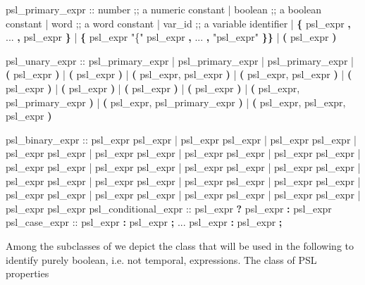 \begin{Grammar}
psl_primary_expr ::
   number                              ;; a numeric constant
 | boolean                             ;; a boolean constant
 | word                                ;; a word constant
 | var_id                              ;; a variable identifier
 | \textbf{\{} psl_expr \textbf{,} ... \textbf{,} psl_expr \textbf{\}}
 | \textbf{\{} psl_expr "\{" psl_expr \textbf{,} ... \textbf{,} "psl_expr" \textbf{\}}\textbf{\}}
 | \textbf{(} psl_expr \textbf{)}

psl_unary_expr ::
   \operator{+} psl_primary_expr     
 | \operator{-} psl_primary_expr  
 | \operator{!} psl_primary_expr  
 |  \textbf{(} psl_expr \textbf{)}
 |  \textbf{(} psl_expr \textbf{)}
 |  \textbf{(} psl_expr, psl_expr \textbf{)}
 |  \textbf{(} psl_expr, psl_expr \textbf{)}
 |  \textbf{(} psl_expr \textbf{)}
 |  \textbf{(} psl_expr \textbf{)}
 |  \textbf{(} psl_expr \textbf{)}
 |  \textbf{(} psl_expr \textbf{)}
 |  \textbf{(} psl_expr, psl_primary_expr \textbf{)}
 |  \textbf{(} psl_expr, psl_primary_expr \textbf{)}
 |  \textbf{(} psl_expr, psl_expr, psl_expr \textbf{)}

psl_binary_expr ::
   psl_expr \operator{+} psl_expr    
 | psl_expr  psl_expr 
 | psl_expr  psl_expr 
 | psl_expr \operator{-} psl_expr   
 | psl_expr \operator{*}psl_expr   
 | psl_expr \operator{/} psl_expr   
 | psl_expr \operator{\%} psl_expr 
 | psl_expr \operator{==} psl_expr    
 | psl_expr \operator{!=} psl_expr  
 | psl_expr \operator{<} psl_expr       
 | psl_expr \operator{<=} psl_expr       
 | psl_expr \operator{>} psl_expr       
 | psl_expr \operator{>=} psl_expr       
 | psl_expr \operator{&} psl_expr 
 | psl_expr \operator{|} psl_expr 
 | psl_expr  psl_expr 
 | psl_expr  psl_expr 
 | psl_expr \operator{<<} psl_expr 
 | psl_expr \operator{>>} psl_expr 
 | psl_expr \operator{::} psl_expr 
psl_conditional_expr ::
 psl_expr \textbf{?} psl_expr \textbf{:} psl_expr 
psl_case_expr ::
     psl_expr \textbf{:} psl_expr \textbf{;}
     ...
     psl_expr \textbf{:} psl_expr \textbf{;}
\end{Grammar}
%
Among the subclasses of  we depict the class
 that will be used in the following to identify purely
boolean, i.e. not temporal, expressions. The class of PSL properties
